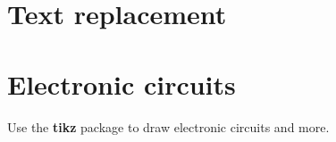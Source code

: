 

\chapter{Text replacement}



\chapter{Electronic circuits}

Use the \textbf{tikz} package to draw electronic circuits and more.



\newpage

\setcounter{page}{\value{romanpagenumbers}}

\printbibliography
  
